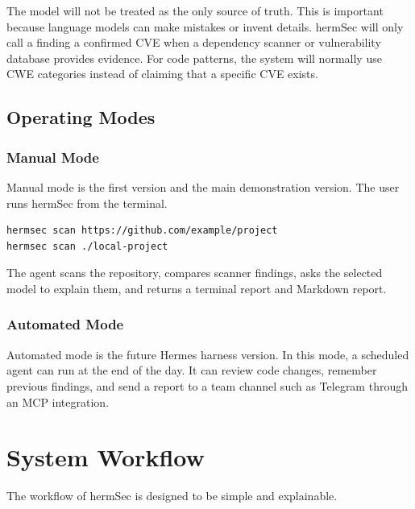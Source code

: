 \documentclass[
    numbers=noenddot,
    parskip=half-,
    fontsize=11pt,
    paper=a4,
    oneside,
    titlepage,
    bibliography=totoc,
    chapterprefix=false
]{scrbook}
\begin{document}
The model will not be treated as the only source of truth. This is important because language models can make mistakes or invent details. hermSec will only call a finding a confirmed CVE when a dependency scanner or vulnerability database provides evidence. For code patterns, the system will normally use CWE categories instead of claiming that a specific CVE exists.

\section{Operating Modes}

\subsection{Manual Mode}

Manual mode is the first version and the main demonstration version. The user runs hermSec from the terminal.

\begin{verbatim}
hermsec scan https://github.com/example/project
hermsec scan ./local-project
\end{verbatim}

The agent scans the repository, compares scanner findings, asks the selected model to explain them, and returns a terminal report and Markdown report.

\subsection{Automated Mode}

Automated mode is the future Hermes harness version. In this mode, a scheduled agent can run at the end of the day. It can review code changes, remember previous findings, and send a report to a team channel such as Telegram through an MCP integration.

\chapter{System Workflow}

The workflow of hermSec is designed to be simple and explainable.
\end{document}

